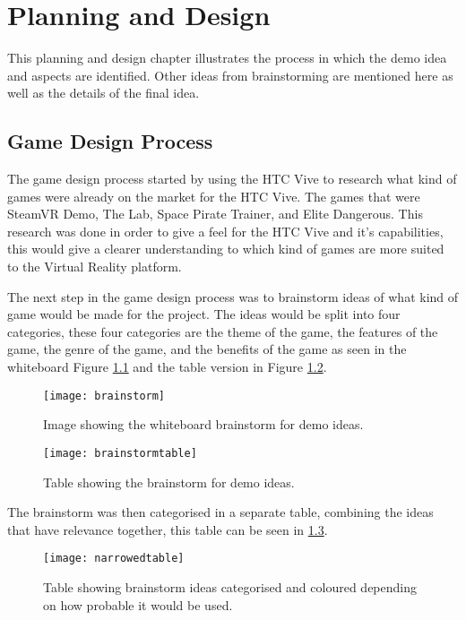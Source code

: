 \chapter{Planning and Design}
\label{chapter5}

This planning and design chapter illustrates the process in which the demo idea and aspects are identified. Other ideas from brainstorming are mentioned here as well as the details of the final idea.

\section{Game Design Process}
The game design process started by using the HTC Vive to research what kind of games were already on the market for the HTC Vive. The games that were SteamVR Demo\cite{steamvr}, The Lab\cite{thelab}, Space Pirate Trainer\cite{spacepiratetrainer}, and Elite Dangerous\cite{elitedangerous}. This research was done in order to give a feel for the HTC Vive and it's capabilities, this would give a clearer understanding to which kind of games are more suited to the Virtual Reality platform.
\newline
\par
The next step in the game design process was to brainstorm ideas of what kind of game would be made for the project. The ideas would be split into four categories, these four categories are the theme of the game, the features of the game, the genre of the game, and the benefits of the game as seen in the whiteboard Figure \ref{fig:brainstorm} and the table version in Figure \ref{fig:brainstormtable}.

\begin{figure}[ht]
	\texttt{[image: brainstorm]}
	\centering
	\caption{Image showing the whiteboard brainstorm for demo ideas.}
	\label{fig:brainstorm}
\end{figure}

\begin{figure}[hb]
	\texttt{[image: brainstormtable]}
	\centering
	\caption{Table showing the brainstorm for demo ideas.}
	\label{fig:brainstormtable}
\end{figure}

\clearpage
The brainstorm was then categorised in a separate table, combining the ideas that have relevance together, this table can be seen in \ref{fig:narrowedtable}.

\begin{figure}[H]
	\texttt{[image: narrowedtable]}
	\centering
	\caption{Table showing brainstorm ideas categorised and coloured depending on how probable it would be used.}
	\label{fig:narrowedtable}
\end{figure}

